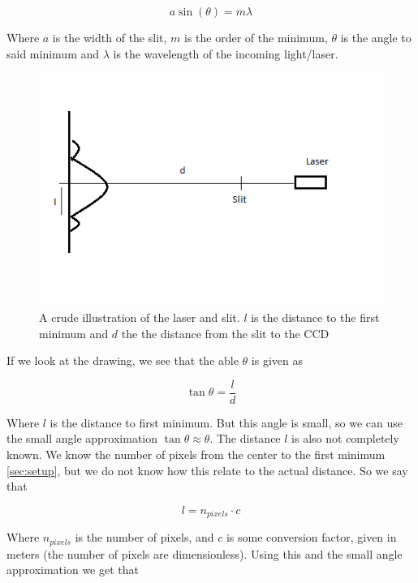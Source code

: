 \documentclass{emulateapj}
\begin{document}
\begin{equation}
a \sin(\theta) = m\lambda
\label{eq:diffPatt}
\end{equation}

Where $a$ is the width of the slit, $m$ is the order of the minimum, $\theta$ is the angle to said minimum and $\lambda$ is the wavelength of the incoming light/laser.

\begin{figure}[H]
\centering
\includegraphics[scale=0.4]{diffPattern.png}
\caption{A crude illustration of the laser and slit. $l$ is the distance to the first minimum and $d$ the the distance from the slit to the CCD}
\end{figure}


If we look at the drawing, we see that the able $\theta$ is given as

\begin{equation}
\tan \theta = \frac{l}{d}
\end{equation}

Where $l$ is the distance to first minimum. But this angle is small, so we can use the small angle approximation $\tan \theta \approx \theta$. The distance $l$ is also not completely known. We know the number of pixels from the center to the first minimum \ref{sec:setup}, but we do not know how this relate to the actual distance. So we say that

\begin{equation}
l = n_{pixels}\cdot c
\end{equation}

Where $n_{pixels}$ is the number of pixels, and $c$ is some conversion factor, given in meters (the number of pixels are dimensionless). Using this and the small angle approximation we get that
\end{document}
